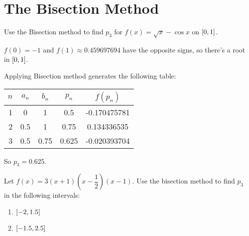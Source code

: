 \documentclass[../../../../Assignments.tex]{subfiles}
\begin{document}
\section{The Bisection Method}

\begin{exercise}
    Use the Bisection method to find \(p_3\) for \(f(x) = \sqrt{x} - \cos{x}\) on \(\interval{0}{1}\).
\end{exercise}

\begin{solution}
    \(f(0) = -1\) and \(f(1) \approx \num{0.459697694}\) have the opposite
    signs, so there's a root in \(\interval{0}{1}\).

    Applying Bisection method generates the following table:

    \begin{table}[H]    %
        \centering
        \begin{tabular}{r S[table-format=1.1] S[table-format=1.2] S[table-format=1.3] S[table-format=-1.9]}
            \toprule
            \(n\)  &  {\(a_n\)}  &  {\(b_n\)}  &  {\(p_n\)}  &  {\(f(p_n)\)}  \\
              &  0          &  1          &  0.5        &  -0.170475781  \\
                2  &  0.5        &  1          &  0.75       &   0.134336535  \\
                3  &  0.5        &  0.75       &  0.625      &  -0.020393704  \\
            \bottomrule
        \end{tabular}
    \end{table}

    So \(p_3 = \num{0.625}\).
\end{solution}

\begin{exercise}
    Let \(f(x) = 3 (x + 1) (x - \dfrac{1}{2}) (x - 1)\). Use the bisection
    method to find \(p_3\) in the following intervals:

    \begin{multicols}{2}
        \begin{enumerate}[label = (\alph*)]
            \item \(\interval{-2}{\num{1.5}}\)
            \item \(\interval{\num{-1.5}}{\num{2.5}}\)
        \end{enumerate}
    \end{multicols}
\end{exercise}
\end{document}
